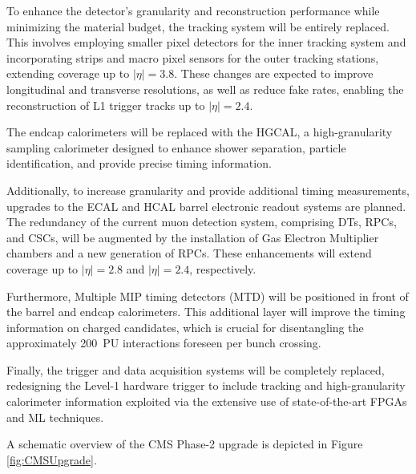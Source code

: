 
To enhance the detector's granularity and reconstruction performance while minimizing the material budget, the tracking system will be entirely replaced. This involves employing smaller pixel detectors for the inner tracking system and incorporating strips and macro pixel sensors for the outer tracking stations, extending coverage up to $|\eta|=3.8$. These changes are expected to improve longitudinal and transverse resolutions, as well as reduce fake rates, enabling the reconstruction of L1 trigger tracks up to $|\eta|=2.4$.

The endcap calorimeters will be replaced with the HGCAL, a high-granularity sampling calorimeter designed to enhance shower separation, particle identification, and provide precise timing information.

Additionally, to increase granularity and provide additional timing measurements, upgrades to the ECAL and HCAL barrel electronic readout systems are planned. The redundancy of the current muon detection system, comprising DTs, RPCs, and CSCs, will be augmented by the installation of Gas Electron Multiplier chambers and a new generation of RPCs. These enhancements will extend coverage up to $|\eta|=2.8$ and $|\eta|=2.4$, respectively.

Furthermore, Multiple MIP timing detectors (MTD) will be positioned in front of the barrel and endcap calorimeters. This additional layer will improve the timing information on charged candidates, which is crucial for disentangling the approximately 200~PU interactions foreseen per bunch crossing.

Finally, the trigger and data acquisition systems will be completely replaced, redesigning the Level-1 hardware trigger to include tracking and high-granularity calorimeter information exploited via the extensive use of state-of-the-art FPGAs and ML techniques.

A schematic overview of the CMS Phase-2 upgrade is depicted in Figure \ref{fig:CMSUpgrade}. 

